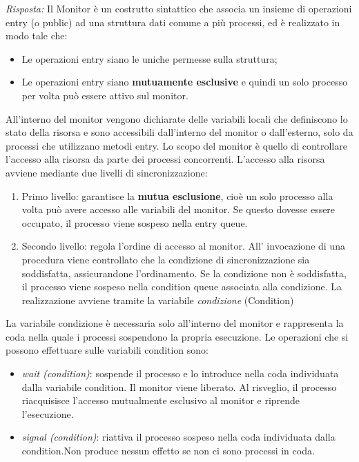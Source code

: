 \documentclass{article}
\newenvironment{solution}
    {\textit{Risposta:}}
    {}
\begin{document}
\begin{solution}
Il Monitor è un costrutto sintattico che associa un insieme di operazioni entry (o public) ad una struttura dati comune a più processi, ed è realizzato in modo tale che:
\begin{itemize}
    \item Le operazioni entry siano le uniche permesse sulla struttura;
    \item Le operazioni entry siano \textbf{mutuamente esclusive} e quindi un solo processo per volta può essere attivo sul monitor.
\end{itemize}
All’interno del monitor vengono dichiarate delle variabili locali che definiscono lo stato della risorsa e sono accessibili dall’interno del monitor o dall’esterno, solo da processi che utilizzano metodi entry.
\newline
Lo scopo del monitor è quello di controllare l’accesso alla risorsa da parte dei processi concorrenti.  
\newline
\newline
L’accesso alla risorsa avviene mediante due livelli di sincronizzazione:  
\begin{enumerate}
    \item Primo livello: garantisce la \textbf{mutua esclusione}, cioè un solo processo alla volta può avere accesso alle variabili del monitor. Se questo dovesse essere occupato, il processo viene sospeso nella entry queue. 
    \item Secondo livello: regola l’ordine di accesso al monitor. All' invocazione di una procedura viene controllato che la condizione di sincronizzazione sia soddisfatta, assicurandone l’ordinamento.
    \newline
    Se la condizione non è soddisfatta, il processo viene sospeso nella condition queue associata alla condizione.
    \newline
    La realizzazione avviene tramite la variabile \textit{condizione} (Condition) 
\end{enumerate}
La variabile condizione è necessaria solo all’interno del monitor e rappresenta la coda nella quale i processi sospendono la propria esecuzione.
\newline
Le operazioni che si possono effettuare sulle variabili condition sono:
\begin{itemize}
    \item \emph{wait (condition)}: sospende il processo e lo introduce nella coda individuata dalla variabile condition. Il monitor viene liberato. Al risveglio, il processo riacquisisce l’accesso mutualmente esclusivo al monitor e riprende l’esecuzione.
    \item \emph{signal (condition)}: riattiva il processo sospeso nella coda individuata dalla condition.\newline Non produce nessun effetto se non ci sono processi in coda.
\end{itemize}
\end{solution}
\end{document}
